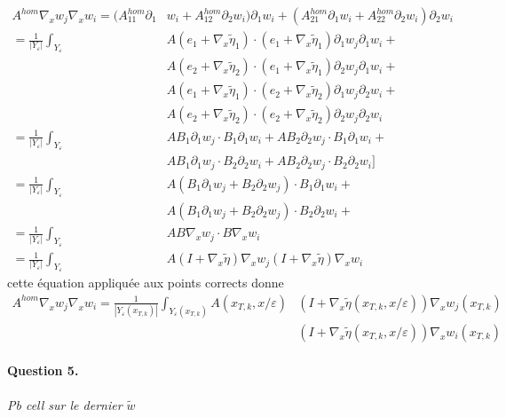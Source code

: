 \documentclass[11pt]{article}
\newcommand{\Ah}{A^{hom}}
\newcommand{\teta}{\tilde{\eta}}
\newcommand{\Ye}{Y_\varepsilon}
\newcommand{\tw}{\tilde{w}}
\newcommand{\question}[2]{\paragraph{Question #1.}\textit{#2} \\}
\begin{document}
\begin{equation}
  \begin{aligned}
    \Ah\nabla_x w_j \nabla_x w_i =(\Ah_{11} \partial_1& w_i + \Ah_{12} \partial_2 w_i) \partial_1 w_i
    + (\Ah_{21} \partial_1 w_i + \Ah_{22} \partial_2 w_i ) \partial_2 w_i \\
    = \frac{1}{|\Ye|} \int_{\Ye} &A(e_1 + \nabla_x \teta_1)\cdot(e_1 + \nabla_x \teta_1) \partial_1 w_j \partial_1 w_i + \\
    &A(e_2 + \nabla_x \teta_2)\cdot(e_1 + \nabla_x \teta_1) \partial_2 w_j \partial_1 w_i +\\ 
    &A(e_1 + \nabla_x \teta_1)\cdot(e_2 + \nabla_x \teta_2) \partial_1 w_j \partial_2 w_i +\\
    &A(e_2 + \nabla_x \teta_2)\cdot(e_2 + \nabla_x \teta_2) \partial_2 w_j \partial_2 w_i  \\
    = \frac{1}{|\Ye|} \int_{\Ye} &A B_1 \partial_1 w_j \cdot B_1 \partial_1 w_i + A B_2 \partial_2 w_j \cdot B_1 \partial_1 w_i +\\ 
    &A B_1 \partial_1 w_j \cdot B_2 \partial_2 w_i + A B_2 \partial_2 w_j \cdot B_2 \partial_2 w_i \big] \\
    = \frac{1}{|\Ye|} \int_{\Ye} &A (B_1 \partial_1 w_j + B_2 \partial_2 w_j ) \cdot B_1 \partial_1 w_i + \\
    &A (B_1 \partial_1 w_j  + B_2 \partial_2 w_j )\cdot B_2 \partial_2 w_i +\\
    = \frac{1}{|\Ye|} \int_{\Ye} &A  B\nabla_x w_j \cdot B\nabla_x w_i  \\
    = \frac{1}{|\Ye|} \int_{\Ye} &A(I + \nabla_x \teta) \nabla_x w_j (I + \nabla_x \teta) \nabla_x w_i
  \end{aligned}
\end{equation}
cette équation appliquée aux points corrects donne
\begin{equation*}
  \begin{aligned}
    \Ah\nabla_x w_j \nabla_x w_i = \frac{1}{|\Ye(x_{T, k})|} \int_{\Ye(x_{T, k})} A(x_{T, k}, x/\varepsilon)&(I + \nabla_x \teta(x_{T, k},
    x/\varepsilon)) \nabla_x w_j(x_{T, k}) \\
    &(I + \nabla_x \teta(x_{T, k}, x/\varepsilon)) \nabla_x w_i(x_{T, k})
  \end{aligned}
\end{equation*}

\question{5}{Pb cell sur le dernier $\tw$}
\end{document}
